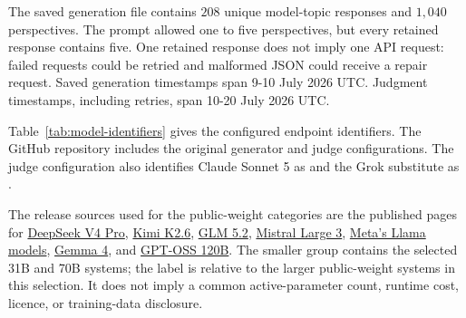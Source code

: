 \documentclass[11pt,a4paper]{article}
\begin{document}
The saved generation file contains $208$ unique model-topic responses and $1{,}040$ perspectives. The prompt allowed one to five perspectives, but every retained response contains five. One retained response does not imply one API request: failed requests could be retried and malformed JSON could receive a repair request. Saved generation timestamps span 9-10 July 2026 UTC. Judgment timestamps, including retries, span 10-20 July 2026 UTC.

Table~\ref{tab:model-identifiers} gives the configured endpoint identifiers. The GitHub repository includes the original generator and judge configurations. The judge configuration also identifies Claude Sonnet 5 as  and the Grok substitute as .

The release sources used for the public-weight categories are the published pages for \href{https://huggingface.co/deepseek-ai/DeepSeek-V4-Pro}{DeepSeek V4 Pro}, \href{https://huggingface.co/moonshotai/Kimi-K2.6}{Kimi K2.6}, \href{https://huggingface.co/zai-org/GLM-5.2}{GLM 5.2}, \href{https://huggingface.co/collections/mistralai/mistral-large-3}{Mistral Large 3}, \href{https://ai.meta.com/llama/get-started/}{Meta's Llama models}, \href{https://blog.google/innovation-and-ai/technology/developers-tools/gemma-4/}{Gemma 4}, and \href{https://huggingface.co/openai/gpt-oss-120b}{GPT-OSS 120B}. The smaller group contains the selected 31B and 70B systems; the label is relative to the larger public-weight systems in this selection. It does not imply a common active-parameter count, runtime cost, licence, or training-data disclosure.
\end{document}
